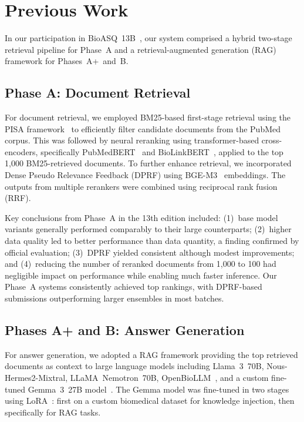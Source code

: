 \section{Previous Work}
\label{sec:previous-work}

In our participation in BioASQ~13B~\cite{jonker2025bit}, our system comprised a hybrid two-stage retrieval pipeline for Phase~A and a retrieval-augmented generation (RAG) framework for Phases~A+~and~B.

\subsection{Phase A: Document Retrieval}

For document retrieval, we employed BM25-based first-stage retrieval using the PISA framework~\cite{mallia2019pisa, macavaney2022python} to efficiently filter candidate documents from the PubMed corpus. This was followed by neural reranking using transformer-based cross-encoders, specifically PubMedBERT~\cite{gu2021domain} and BioLinkBERT~\cite{yasunaga2022linkbert}, applied to the top 1,000 BM25-retrieved documents. To further enhance retrieval, we incorporated Dense Pseudo Relevance Feedback (DPRF) using BGE-M3~\cite{chen2024bge} embeddings. The outputs from multiple rerankers were combined using reciprocal rank fusion (RRF).

Key conclusions from Phase~A in the 13th edition included: (1)~base model variants generally performed comparably to their large counterparts; (2)~higher data quality led to better performance than data quantity, a finding confirmed by official evaluation; (3)~DPRF yielded consistent although modest improvements; and (4)~reducing the number of reranked documents from 1,000 to 100 had negligible impact on performance while enabling much faster inference. Our Phase~A systems consistently achieved top rankings, with DPRF-based submissions outperforming larger ensembles in most batches.

\subsection{Phases A+ and B: Answer Generation}

For answer generation, we adopted a RAG framework providing the top retrieved documents as context to large language models including Llama~3~70B, Nous-Hermes2-Mixtral, LLaMA~Nemotron~70B, OpenBioLLM~\cite{pal2024openbiollms}, and a custom fine-tuned Gemma~3~27B model~\cite{gemma2025}. The Gemma model was fine-tuned in two stages using LoRA~\cite{hu2022lora}: first on a custom biomedical dataset for knowledge injection, then specifically for RAG tasks.

